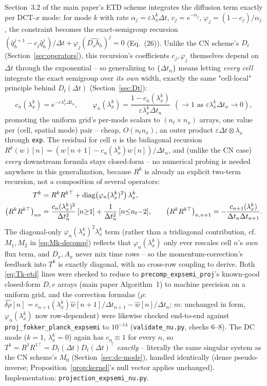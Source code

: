 \documentclass[11pt]{article}
\newcommand{\eps}{\varepsilon}
\newcommand{\dt}{\Delta t}
\newcommand{\code}[1]{\texttt{#1}}
\newcommand{\lx}{\lambda_x^k}
\begin{document}
Section~3.2 of the main paper's ETD scheme integrates the diffusion term exactly per DCT-$x$
mode: for mode $k$ with rate $\alpha_j = \eps\lx\dt$, $c_j=e^{-\alpha_j}$,
$\varphi_j=(1-c_j)/\alpha_j$, the constraint becomes the exact-semigroup recursion
$(\hat q_h^{j+1} - c_j\hat q_h^j)/\dt + \varphi_j(\widehat{D_xb_h})^j = 0$ (Eq.~(26)). Unlike the
CN scheme's $D_t$ (Section~\ref{sec:operators}), this recursion's coefficients $c_j,\varphi_j$ themselves depend on
$\dt$ through the exponential -- so generalizing to $\{\dt_n\}$ means letting \emph{every cell}
integrate the exact semigroup over \emph{its own} width, exactly the same "cell-local" principle
behind $D_t(\dt)$ (Section~\ref{sec:Dt}):
\begin{equation}
  \label{eq:etd-coeffs}
  c_n(\lx) = e^{-\eps\lx\dt_n}, \qquad
  \varphi_n(\lx) = \frac{1-c_n(\lx)}{\eps\lx\dt_n} \ \ (\to 1 \text{ as } \eps\lx\dt_n\to0),
\end{equation}
promoting the uniform grid's per-mode scalars to $(n_t\times n_x)$ arrays, one value per
(cell, spatial mode) pair -- cheap, $O(n_tn_x)$, an outer product $\eps\dt\otimes\lambda_x$
through \texttt{exp}. The residual for cell $n$ is the bidiagonal recursion
$R^k(w)[n] = (w[n{+}1]-c_n(\lx)w[n])/\dt_n$, and (unlike the CN case) \emph{every} downstream
formula stays closed-form -- no numerical probing is needed anywhere in this generalization,
because $R^k$ is already an explicit two-term recursion, not a composition of several operators:
\begin{align}
  \label{eq:Tk-etd}
  T^k &= R^kR^{k\top} + \mathrm{diag}\bigl(\varphi_n(\lx)^2\bigr)\,\lx, \\
  \bigl(R^kR^{k\top}\bigr)_{nn} &= \frac{c_n(\lx)^2}{\dt_n^2}\,[n{\ge}1] + \frac1{\dt_n^2}\,[n{\le}n_t{-}2],
  \qquad
  \bigl(R^kR^{k\top}\bigr)_{n,n+1} = -\frac{c_{n+1}(\lx)}{\dt_n\dt_{n+1}}. \notag
\end{align}
The diagonal-only $\varphi_n(\lx)^2\lx$ term (rather than a tridiagonal contribution, cf.\
$M_1,M_2$ in \eqref{eq:Mk-decomp}) reflects that $\varphi_n(\lx)$ only ever rescales cell $n$'s
\emph{own} flux term, and $D_x,A_x$ never mix time rows -- so the momentum-correction's
feedback into $T^k$ is exactly diagonal, with no cross-row coupling to derive. Both \eqref{eq:Tk-etd}
lines were checked to reduce to \code{precomp\_expsemi\_proj}'s known-good closed-form $D,e$
arrays (main paper Algorithm~1) to machine precision on a uniform grid, and the correction
formulas ($\rho$: $\widehat{\delta\rho}[n] = c_{n+1}(\lx)\hat w[n{+}1]/\dt_{n+1} -
\hat w[n]/\dt_n$; $m$: unchanged in form, $\varphi_n(\lx)$ now row-dependent) were likewise
checked end-to-end against \code{proj\_fokker\_planck\_expsemi} to $10^{-14}$
(\code{validate\_nu.py}, checks 6--8). The DC mode ($k{=}1$, $\lx{=}0$) again has $c_n\equiv1$
for every $n$, so $T^1=R^{1}R^{1\top}=D_t(\dt)D_t(\dt)^\top$ \emph{exactly} -- literally the same
singular system as the CN scheme's $M_0$ (Section~\ref{sec:dc-mode}), handled identically (dense
pseudo-inverse; Proposition~\ref{prop:kernel}'s null vector applies unchanged). Implementation:
\code{projection\_expsemi\_nu.py}.
\end{document}
